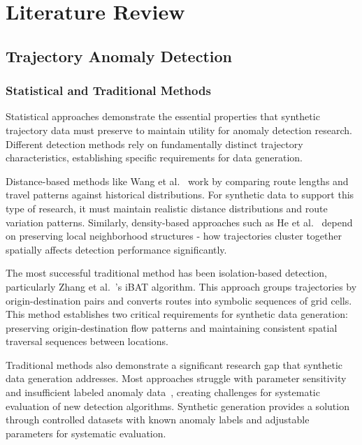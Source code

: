 \documentclass[runningheads]{llncs}
\begin{document}
\section{Literature Review}
\label{sec:literature-review}

\subsection{Trajectory Anomaly Detection}
\label{sec:anomaly-review}

\subsubsection{Statistical and Traditional Methods}
\label{sec:statistical-traditional}

Statistical approaches demonstrate the essential properties that synthetic trajectory data must preserve to maintain utility for anomaly detection research. Different detection methods rely on fundamentally distinct trajectory characteristics, establishing specific requirements for data generation.

Distance-based methods like Wang et al.~\cite{wang2020statistical} work by comparing route lengths and travel patterns against historical distributions. For synthetic data to support this type of research, it must maintain realistic distance distributions and route variation patterns. Similarly, density-based approaches such as He et al.~\cite{he2020enhanced} depend on preserving local neighborhood structures - how trajectories cluster together spatially affects detection performance significantly.

The most successful traditional method has been isolation-based detection, particularly Zhang et al.~\cite{zhang2019ibat}'s iBAT algorithm. This approach groups trajectories by origin-destination pairs and converts routes into symbolic sequences of grid cells. This method establishes two critical requirements for synthetic data generation: preserving origin-destination flow patterns and maintaining consistent spatial traversal sequences between locations.

Traditional methods also demonstrate a significant research gap that synthetic data generation addresses. Most approaches struggle with parameter sensitivity and insufficient labeled anomaly data~\cite{zhang2019ibat}, creating challenges for systematic evaluation of new detection algorithms. Synthetic generation provides a solution through controlled datasets with known anomaly labels and adjustable parameters for systematic evaluation.
\end{document}
